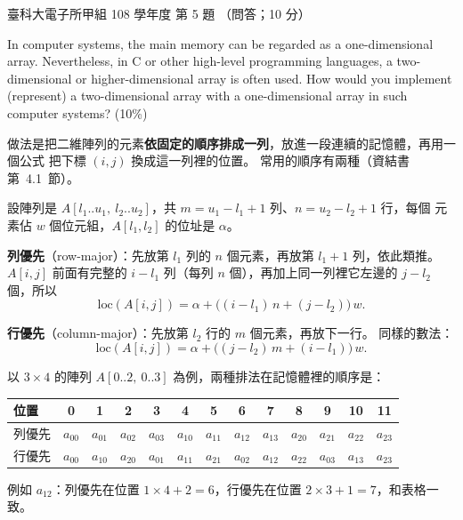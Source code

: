 \begin{pastexam}[label={px:ntust-108-et-dlds-05}]{臺科大電子所甲組 108 學年度 第 5 題}
（問答；10 分）

In computer systems, the main memory can be regarded as a one-dimensional array. Nevertheless,
in C or other high-level programming languages, a two-dimensional or higher-dimensional array is
often used. How would you implement (represent) a two-dimensional array with a one-dimensional
array in such computer systems? (10\%)
\end{pastexam}

\begin{pastsoln}
做法是把二維陣列的元素\textbf{依固定的順序排成一列}，放進一段連續的記憶體，再用一個公式
把下標 $(i, j)$ 換成這一列裡的位置。 常用的順序有兩種（資結書第~4.1~節）。

設陣列是 $A[l_1..u_1,\ l_2..u_2]$，共 $m = u_1 - l_1 + 1$ 列、$n = u_2 - l_2 + 1$ 行，每個
元素佔 $w$ 個位元組，$A[l_1, l_2]$ 的位址是 $\alpha$。

\textbf{列優先}（row-major）：先放第 $l_1$ 列的 $n$ 個元素，再放第 $l_1 + 1$ 列，依此類推。
$A[i, j]$ 前面有完整的 $i - l_1$ 列（每列 $n$ 個），再加上同一列裡它左邊的 $j - l_2$ 個，所以
\[
\mathrm{loc}(A[i, j]) = \alpha + \bigl((i - l_1)\,n + (j - l_2)\bigr)\,w .
\]

\textbf{行優先}（column-major）：先放第 $l_2$ 行的 $m$ 個元素，再放下一行。 同樣的數法：
\[
\mathrm{loc}(A[i, j]) = \alpha + \bigl((j - l_2)\,m + (i - l_1)\bigr)\,w .
\]

以 $3 \times 4$ 的陣列 $A[0..2,\ 0..3]$ 為例，兩種排法在記憶體裡的順序是：
\begin{center}
\small
\begin{tabular}{l*{12}{c}}
\toprule
位置 & 0 & 1 & 2 & 3 & 4 & 5 & 6 & 7 & 8 & 9 & 10 & 11 \\
\midrule
列優先 & $a_{00}$ & $a_{01}$ & $a_{02}$ & $a_{03}$ & $a_{10}$ & $a_{11}$ & $a_{12}$ & $a_{13}$
       & $a_{20}$ & $a_{21}$ & $a_{22}$ & $a_{23}$ \\
行優先 & $a_{00}$ & $a_{10}$ & $a_{20}$ & $a_{01}$ & $a_{11}$ & $a_{21}$ & $a_{02}$ & $a_{12}$
       & $a_{22}$ & $a_{03}$ & $a_{13}$ & $a_{23}$ \\
\bottomrule
\end{tabular}
\end{center}
例如 $a_{12}$：列優先在位置 $1 \times 4 + 2 = 6$，行優先在位置 $2 \times 3 + 1 = 7$，和表格一致。


\end{pastsoln}
